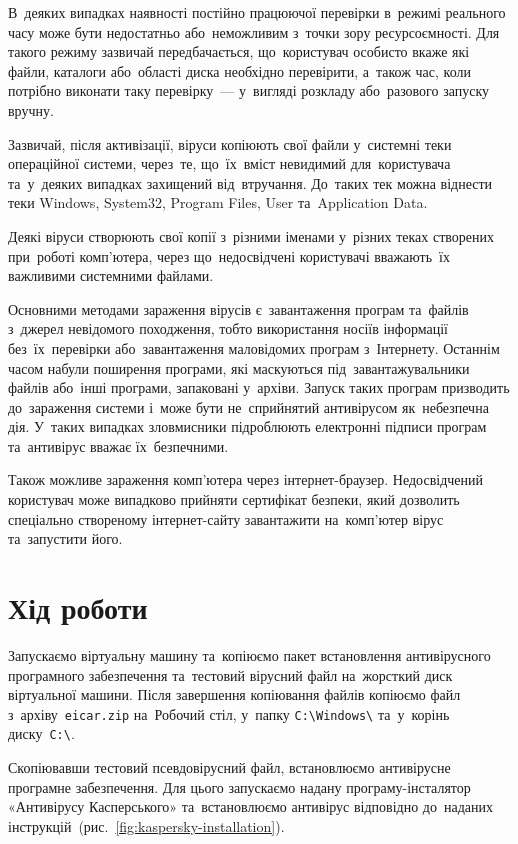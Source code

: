 \documentclass[
	a4paper,
	oneside,
	DIV = 12,
	fontsize = 13pt,
	headings = normal,
]{scrartcl}
\newcommand{\filename}[1]{\texttt{#1}}
\begin{document}
		В~деяких випадках наявності постійно працюючої перевірки в~режимі реального часу може бути недостатньо або~неможливим з~точки зору ресурсоємності. Для такого режиму зазвичай передбачається, що~користувач особисто вкаже які файли, каталоги або~області диска необхідно перевірити, а~також час, коли потрібно виконати таку перевірку~— у~вигляді розкладу або~разового запуску вручну.

		Зазвичай, після активізації, віруси копіюють свої файли у~системні теки операційної системи, через~те, що~їх~вміст невидимий для~користувача та~у~деяких випадках захищений від~втручання. До~таких тек можна віднести теки \textenglish{Windows, System32, Program Files, User} та~\textenglish{Application Data}.

		Деякі віруси створюють свої копії з~різними іменами у~різних теках створених при~роботі комп’ютера, через що~недосвідчені користувачі вважають~їх важливими системними файлами.

		Основними методами зараження вірусів є~завантаження програм та~файлів з~джерел невідомого походження, тобто використання носіїв інформації без~їх~перевірки або~завантаження маловідомих програм з~Інтернету. Останнім часом набули поширення програми, які маскуються під~завантажувальники файлів або~інші програми, запаковані у~архіви. Запуск таких програм призводить до~зараження системи і~може бути не~сприйнятий антивірусом як~небезпечна дія. У~таких випадках зловмисники підроблюють електронні підписи програм та~антивірус вважає їх~безпечними.

		Також можливе зараження комп’ютера через інтернет-браузер. Недосвідчений користувач може випадково прийняти сертифікат безпеки, який дозволить спеціально створеному інтернет-сайту завантажити на~комп’ютер вірус та~запустити його.

	\section{Хід роботи}
		Запускаємо віртуальну машину та~копіюємо пакет встановлення антивірусного програмного забезпечення та~тестовий вірусний файл на~жорсткий диск віртуальної машини. Після завершення копіювання файлів копіюємо файл з~архіву~\filename{eicar.zip} на~Робочий стіл, у~папку \verb|C:\Windows\| та~у~корінь диску~\verb|C:\|.

		Скопіювавши тестовий псевдовірусний файл, встановлюємо антивірусне програмне забезпечення. Для цього запускаємо надану програму-інсталятор «Антивірусу Касперського» та~встановлюємо антивірус відповідно до~наданих інструкцій~(рис.~\ref{fig:kaspersky-installation}).
\end{document}
